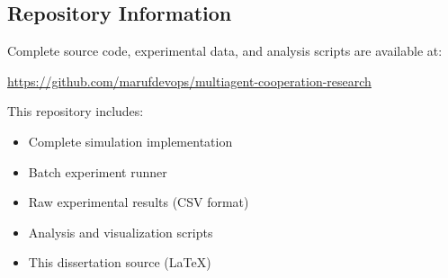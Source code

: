 \subsection{Repository Information}

Complete source code, experimental data, and analysis scripts are available at:

\begin{center}
\url{https://github.com/marufdevops/multiagent-cooperation-research}
\end{center}

This repository includes:
\begin{itemize}
    \item Complete simulation implementation
    \item Batch experiment runner
    \item Raw experimental results (CSV format)
    \item Analysis and visualization scripts
    \item This dissertation source (LaTeX)
\end{itemize}

